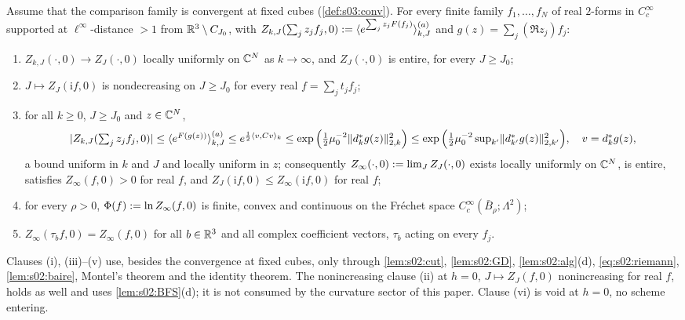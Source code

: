 \begin{lemma}\label{lem:s05:TWC}
Assume that the comparison family is convergent at fixed cubes (\cref{def:s03:conv}). For every finite family $f_1,\dots,f_N$ of real $2$-forms in $C^\infty_c$ supported at $\ell^\infty$-distance $>1$ from $\mathbb R^3\setminus C_{J_0}$, with $Z_{k,J}(\sum_jz_jf_j,0):=\langle e^{\sum_jz_jF(f_j)}\rangle^{(a)}_{k,J}$ and $g(z)=\sum_j(\Re z_j)f_j$:
\begin{enumerate}[label=\textup{(\roman*)},leftmargin=*]
\item $Z_{k,J}(\cdot,0)\to Z_J(\cdot,0)$ locally uniformly on $\mathbb C^N$ as $k\to\infty$, and $Z_J(\cdot,0)$ is entire, for every $J\ge J_0$;
\item $J\mapsto Z_J(\mathrm if,0)$ is nondecreasing on $J\ge J_0$ for every real $f=\sum_jt_jf_j$;
\item for all $k\ge0$, $J\ge J_0$ and $z\in\mathbb C^N$,
\[
|Z_{k,J}(\textstyle\sum_jz_jf_j,0)|\le\langle e^{F(g(z))}\rangle^{(a)}_{k,J}\le e^{\frac12\langle v,Cv\rangle_k}\le\exp\Big(\tfrac12\mu_0^{-2}\lVert d^{*}_kg(z)\rVert^2_{2,k}\Big)\le\exp\Big(\tfrac12\mu_0^{-2}\sup_{k'}\lVert d^{*}_{k'}g(z)\rVert^2_{2,k'}\Big),\quad v=d^{*}_kg(z),
\]
a bound uniform in $k$ and $J$ and locally uniform in $z$; consequently $Z_\infty(\cdot,0):=\lim_JZ_J(\cdot,0)$ exists locally uniformly on $\mathbb C^N$, is entire, satisfies $Z_\infty(f,0)>0$ for real $f$, and $Z_J(\mathrm if,0)\le Z_\infty(\mathrm if,0)$ for real $f$;
\item for every $\rho>0$, $\Phi(f):=\ln Z_\infty(f,0)$ is finite, convex and continuous on the Fr\'echet space $C^\infty_c(\bar B_\rho;\Lambda^2)$;
\item $Z_\infty(\tau_bf,0)=Z_\infty(f,0)$ for all $b\in\mathbb R^3$ and all complex coefficient vectors, $\tau_b$ acting on every $f_j$.
\end{enumerate}
Clauses \textup{(i)}, \textup{(iii)}--\textup{(v)} use, besides the convergence at fixed cubes, only \cite[Thm.~6.2(1),(2)]{BFS1} through \cref{lem:s02:cut}, \cref{lem:s02:GD}, \cref{lem:s02:alg}\textup{(d)}, \eqref{eq:s02:riemann}, \cref{lem:s02:baire}, Montel's theorem and the identity theorem. The nonincreasing clause \textup{(ii)} at $h=0$, $J\mapsto Z_J(f,0)$ nonincreasing for real $f$, holds as well and uses \cref{lem:s02:BFS}\textup{(d)}; it is not consumed by the curvature sector of this paper. Clause \textup{(vi)} is void at $h=0$, no scheme entering.
\end{lemma}

